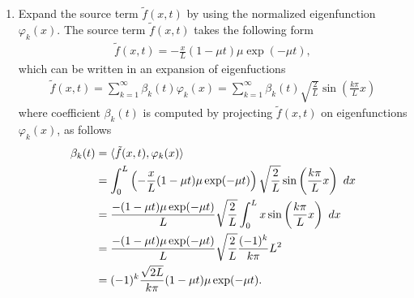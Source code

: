 \documentclass[12pt]{article}
\begin{document}
\begin{enumerate}
	\item Expand the source term $\tilde{f}(x,t)$ by using the normalized eigenfunction $\varphi_{k}(x)$.
	      The source term $\tilde{f}(x,t)$ takes the following form
	      \begin{align}
		      \tilde{f}(x,t) = -\frac{x}{L} (1-\mu t)\mu \exp(-\mu t),
	      \end{align}
	      which can be written in an expansion of eigenfuctions
	      \begin{align}
		      \label{eq:ftilde}
		      \boxed{
			      \tilde{f}(x,t)
			      = \sum_{k=1}^\infty \beta_k(t) \varphi_{k}(x)
			      = \sum_{k=1}^\infty \beta_k(t) \sqrt{\frac{2}{L}} \sin\left( \frac{k \pi}{L} x \right)
		      }
	      \end{align}
	      where coefficient $\beta_{k}(t)$ is computed by projecting $\tilde{f}(x,t)$ on eigenfunctions $\varphi_{k}(x)$, 
	      as follows
	      \begin{align}
		      \label{eq:betacoefficient}
		      \beta_k(t)
		       & = \langle \tilde{f}(x,t),\varphi_{k}(x) \rangle             \notag \\
		       & = \int_0^L 
		      \left(-\frac{x}{L} (1-\mu t)\mu \exp(-\mu t) \right)
		      \sqrt{\frac{2}{L}} \sin\left(\frac{k \pi}{L} x\right) \ dx     \notag \\
		       & = \frac{-(1-\mu t) \mu \exp(-\mu t)}{L} \sqrt{\frac{2}{L}}
		      \int_0^L x
		      \sin\left(\frac{k \pi}{L} x\right) \ dx                        \notag \\  
		       & = \frac{-(1-\mu t) \mu \exp(-\mu t)}{L} \sqrt{\frac{2}{L}}
		      \frac{(-1)^k}{k\pi}L^2                                         \notag \\
		       & = (-1)^k \frac{\sqrt{2L}}{k \pi}(1-\mu t)\mu \exp(-\mu t).
	      \end{align}
	      

\end{enumerate}
\end{document}
